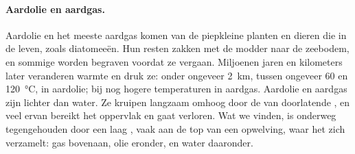 \paragraph{Aardolie en aardgas.} Aardolie en het meeste aardgas komen van
de piepkleine planten en dieren die in de  leven, zoals diatomeeën.
Hun resten zakken met de modder naar de zeebodem, en sommige worden
begraven voordat ze vergaan. Miljoenen jaren en kilometers  later
veranderen warmte en druk ze: onder ongeveer \qty{2}{km}, tussen ongeveer
60 en \qty{120}{\degreeCelsius}, in aardolie; bij nog hogere temperaturen
in aardgas. Aardolie en aardgas zijn lichter dan water. Ze kruipen langzaam
omhoog door de  van doorlatende , en veel ervan bereikt het
oppervlak en gaat verloren. Wat we vinden, is onderweg tegengehouden door
een laag  , vaak aan de top van een opwelving, waar
het zich verzamelt: gas bovenaan, olie eronder, en water daaronder.

